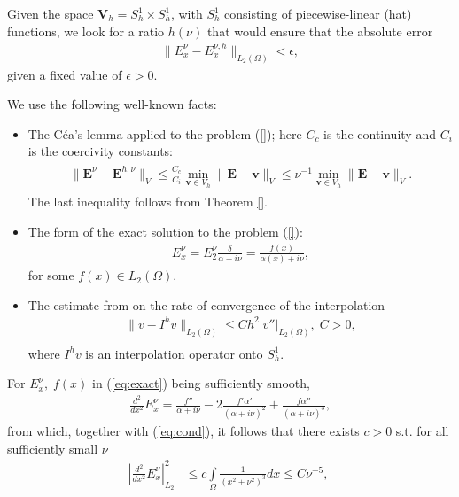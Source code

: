 Given the space $\mathbf{V}_{h}=S_{h}^{1}\times S_{h}^{1}$, with $S_{h}^{1}$ consisting of piecewise-linear (hat) functions, we look for a ratio $h(\nu)$ that would ensure that the absolute error 
\begin{align}
\label{eq:problem1}
\|E^{\nu}_{x}-E^{\nu,h}_{x}\|_{L_{2}(\Omega)}<\epsilon,
\end{align}
given a fixed value of $\epsilon>0$. 

We use the following well-known facts:
\begin{itemize}
 \item The C\'ea's lemma applied to the problem (\ref{}); here $C_c$ is the continuity and $C_i$ is the coercivity constants:
\begin{align}
\label{eq:cea}
\begin{split}
 \|\mathbf{E}^{\nu}-\mathbf{E}^{h,\nu}\|_{V}\leq \frac{C_c}{C_i}\min_{\mathbf{v}\in V_h}\|\mathbf{E}-\mathbf{v}\|_{V}
 \leq \nu^{-1}\min_{\mathbf{v}\in V_h}\|\mathbf{E}-\mathbf{v}\|_{V}.
 \end{split}
\end{align}
The last inequality follows from Theorem \ref{}.  
\item The form of the exact solution to the problem (\ref{}):
\begin{align}
\label{eq:exact}
 E_x^{\nu}=E_{2}^{\nu}\frac{\delta}{\alpha+i\nu}=\frac{f(x)}{\alpha(x)+i\nu},
\end{align}
for some $f(x)\in L_{2}(\Omega)$.
\item The estimate from \cite[Chapter 0]{Brenner_Scott} on the rate of convergence of the interpolation 
\begin{align}
\label{eq:bsc}
 \|v-I^{h}v\|_{L_{2}(\Omega)}\leq Ch^2|v''|_{L_{2}(\Omega)},\; C>0,\\
\end{align}
where $I^{h}v$ is an interpolation operator onto $S_{h}^{1}$.
\end{itemize}
For $E_x^{\nu},\;f(x)$ in (\ref{eq:exact}) being sufficiently smooth, 
\begin{align*}
 \frac{d^2}{dx^2}E_x^{\nu}=\frac{f''}{\alpha+i\nu}-2\frac{f'\alpha'}{(\alpha+i\nu)^2}+\frac{f\alpha''}{(\alpha+i\nu)^3},
\end{align*}
from which, together with (\ref{eq:cond}), it follows that there exists $c>0$ s.t. for all sufficiently small $\nu$ 
\begin{align*}
 \left|  \frac{d^2}{dx^2}E_x^{\nu}\right|_{L_2}^{2}&\leq c\int\limits_{\Omega}\frac{1}{(x^2+\nu^2)^{3}}dx
 \leq C\nu^{-5},\; 
\end{align*}
